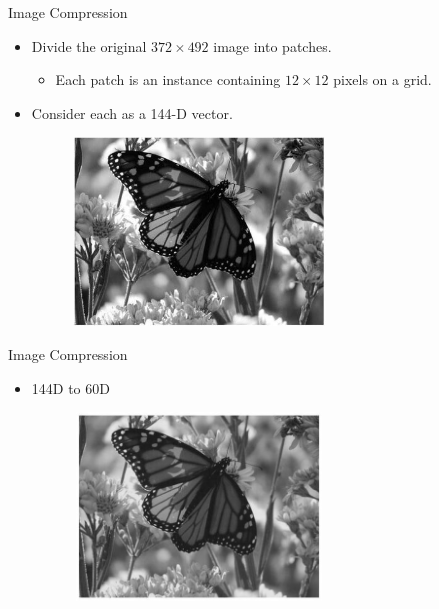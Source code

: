 \documentclass[serif, aspectratio=169]{beamer}
\begin{document}
\begin{frame}{Image Compression}
      \begin{itemize}
          \item Divide the original $372 \times 492$ image into patches.
\begin{itemize}
    \item Each patch is an instance containing $12 \times 12$ pixels on a grid.
\end{itemize}
            \item Consider each as a 144-D vector.
      \end{itemize}
        \begin{figure}[htpb]
            \begin{center}
                \includegraphics[width=8cm, height=5cm]{pic/original.JPG}
            \end{center}
        \end{figure}
\end{frame}

\begin{frame}{Image Compression}
      \begin{itemize}
          \item 144D to 60D
      \end{itemize}
        \begin{figure}[htpb]
            \begin{center}
                \includegraphics[width=8cm, height=5cm]{pic/60d.JPG}
            \end{center}
        \end{figure}
\end{frame}
\end{document}
